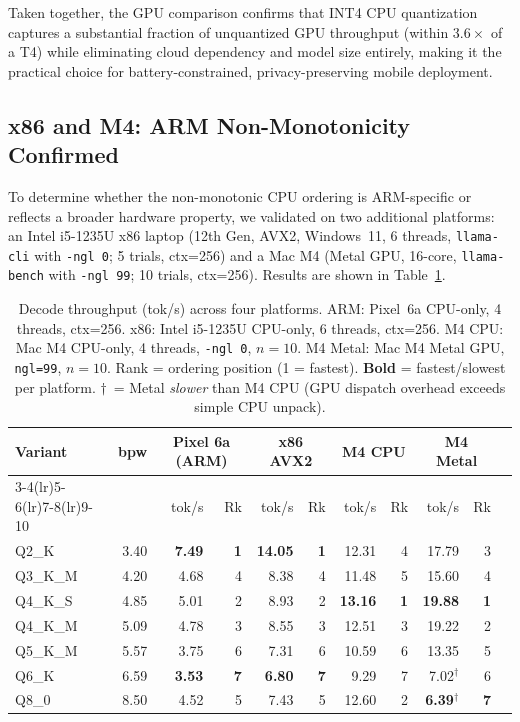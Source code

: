\documentclass[conference]{IEEEtran}
\begin{document}
Taken together, the GPU comparison confirms that INT4 CPU quantization captures
a substantial fraction of unquantized GPU throughput (within $3.6\times$ of a T4)
while eliminating cloud dependency and model size entirely, making it the
practical choice for battery-constrained, privacy-preserving mobile deployment.

\subsection{x86 and M4: ARM Non-Monotonicity Confirmed}
\label{sec:xplat}

To determine whether the non-monotonic CPU ordering is ARM-specific or
reflects a broader hardware property, we validated on two additional platforms:
an Intel i5-1235U x86 laptop (12th Gen, AVX2, Windows~11, 6 threads,
\texttt{llama-cli} with \texttt{-ngl~0}; 5 trials, ctx=256) and a Mac M4
(Metal GPU, 16-core, \texttt{llama-bench} with \texttt{-ngl~99}; 10 trials, ctx=256).
Results are shown in Table~\ref{tab:crossdevice}.

\begin{table}[h]
\centering
\caption{Decode throughput (tok/s) across four platforms.
ARM: Pixel~6a CPU-only, 4 threads, ctx=256.
x86: Intel i5-1235U CPU-only, 6 threads, ctx=256.
M4 CPU: Mac M4 CPU-only, 4 threads, \texttt{-ngl~0}, $n{=}10$.
M4 Metal: Mac M4 Metal GPU, \texttt{ngl=99}, $n{=}10$.
Rank = ordering position (1 = fastest).
\textbf{Bold} = fastest/slowest per platform.
$\dagger$~= Metal \emph{slower} than M4 CPU (GPU dispatch overhead exceeds simple CPU unpack).}
\label{tab:crossdevice}
\setlength{\tabcolsep}{3pt}
\begin{tabular}{lrrrrrrrrrr}
\toprule
\textbf{Variant} & \textbf{bpw} &
\multicolumn{2}{c}{\textbf{Pixel 6a (ARM)}} &
\multicolumn{2}{c}{\textbf{x86 AVX2}} &
\multicolumn{2}{c}{\textbf{M4 CPU}} &
\multicolumn{2}{c}{\textbf{M4 Metal}} \\
\cmidrule(lr){3-4}\cmidrule(lr){5-6}\cmidrule(lr){7-8}\cmidrule(lr){9-10}
 & & tok/s & Rk & tok/s & Rk & tok/s & Rk & tok/s & Rk \\
\midrule
Q2\_K    & 3.40 & \textbf{7.49} & \textbf{1} & \textbf{14.05} & \textbf{1} & 12.31 & 4 & 17.79 & 3 \\
Q3\_K\_M & 4.20 & 4.68 & 4 & 8.38 & 4 & 11.48 & 5 & 15.60 & 4 \\
Q4\_K\_S & 4.85 & 5.01 & 2 & 8.93 & 2 & \textbf{13.16} & \textbf{1} & \textbf{19.88} & \textbf{1} \\
Q4\_K\_M & 5.09 & 4.78 & 3 & 8.55 & 3 & 12.51 & 3 & 19.22 & 2 \\
Q5\_K\_M & 5.57 & 3.75 & 6 & 7.31 & 6 & 10.59 & 6 & 13.35 & 5 \\
Q6\_K    & 6.59 & \textbf{3.53} & \textbf{7} & \textbf{6.80} & \textbf{7} & 9.29 & 7 & 7.02$^\dagger$ & 6 \\
Q8\_0    & 8.50 & 4.52 & 5 & 7.43 & 5 & 12.60 & 2 & \textbf{6.39}$^\dagger$ & \textbf{7} \\
\bottomrule
\end{tabular}
\end{table}
\end{document}
